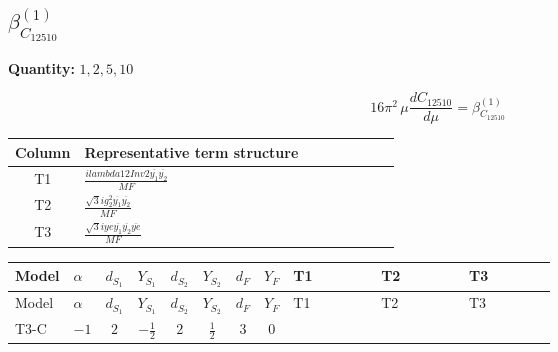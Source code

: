 \documentclass[8pt]{article}
\begin{document}
\begin{landscape}
\section*{$\beta_{C_{12510}}^{(1)}$}
\noindent\textbf{Quantity: }$\mathrm{1,2,5,10}$\par\smallskip
\[16\pi^2\,\mu\frac{d C_{12510}}{d\mu}=\beta_{C_{12510}}^{(1)}\]
\begin{center}
\begin{tabular}{@{}c >{\raggedright\arraybackslash}p{0.82\linewidth}@{}}
\toprule
Column & Representative term structure \\
\midrule
T1 & \(\displaystyle \frac{i lambda12Inv2 \overline{y_{1}} \overline{y_{2}}}{MF}\) \\
\midrule
T2 & \(\displaystyle \frac{\sqrt{3} i g_{2}^{2} \overline{y_{1}} \overline{y_{2}}}{MF}\) \\
\midrule
T3 & \(\displaystyle \frac{\sqrt{3} i ye \overline{y_{1}} \overline{y_{2}} \overline{ye}}{MF}\) \\
\midrule
\bottomrule
\end{tabular}
\end{center}
\smallskip
\tiny
\begin{longtable}{@{}llcccccc >{\raggedright\arraybackslash}p{0.21\linewidth} >{\raggedright\arraybackslash}p{0.21\linewidth} >{\raggedright\arraybackslash}p{0.21\linewidth}@{}}
\toprule
Model & $\alpha$ & $d_{S_1}$ & $Y_{S_1}$ & $d_{S_2}$ & $Y_{S_2}$ & $d_F$ & $Y_F$ & T1 & T2 & T3 \\
\midrule
\endfirsthead
\toprule
Model & $\alpha$ & $d_{S_1}$ & $Y_{S_1}$ & $d_{S_2}$ & $Y_{S_2}$ & $d_F$ & $Y_F$ & T1 & T2 & T3 \\
\midrule
\endhead
T3-C & $-1$ & $2$ & $-\frac{1}{2}$ & $2$ & $\frac{1}{2}$ & $3$ & $0$ & \scriptsize\adjustbox{max width=\linewidth}{$\begin{gathered} - \frac{i lambda12Inv2 \overline{y_{1}} \overline{y_{2}}}{6 MF}\end{gathered}$} & \scriptsize\adjustbox{max width=\linewidth}{$\begin{gathered} - \frac{\sqrt{3} i g_{2}^{2} \overline{y_{1}} \overline{y_{2}}}{8 MF}\end{gathered}$} & \scriptsize\adjustbox{max width=\linewidth}{$\begin{gathered} \frac{\sqrt{3} i ye \overline{y_{1}} \overline{y_{2}} \overline{ye}}{24 MF}\end{gathered}$} \\
\midrule
\bottomrule
\end{longtable}
\clearpage

\end{landscape}
\end{document}
